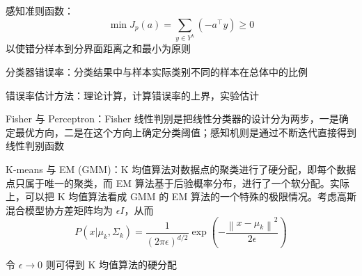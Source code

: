 \documentclass[openany]{ctexbook}
\theoremstyle{kaiti}
\theoremstyle{normal}
\begin{document}
感知准则函数：
  \begin{equation}
  \min J_p\left(a \right)=\sum_{y\in Y^k}\left(-a^{\top}y \right)\geqslant 0
  \end{equation}
  以使错分样本到分界面距离之和最小为原则

分类器错误率：分类结果中与样本实际类别不同的样本在总体中的比例

错误率估计方法：理论计算，计算错误率的上界，实验估计

Fisher 与 Perceptron：Fisher 线性判别是把线性分类器的设计分为两步，一是确定最优方向，二是在这个方向上确定分类阈值；感知机则是通过不断迭代直接得到线性判别函数

K-means 与 EM (GMM)：K 均值算法对数据点的聚类进行了硬分配，即每个数据点只属于唯一的聚类，而 EM 算法基于后验概率分布，进行了一个软分配。实际上，可以把 K 均值算法看成 GMM 的 EM 算法的一个特殊的极限情况。考虑高斯混合模型协方差矩阵均为 $\epsilon I$，从而
\begin{equation}
  P\left(x|\mu_k,\Sigma_k \right)=\frac{1}{\left(2\pi \epsilon \right)^{d/2}}\exp \left(-\frac{\left\| x-\mu_k \right\|^2}{2\epsilon}\right)
\end{equation}

令 $\epsilon \rightarrow 0$ 则可得到 K 均值算法的硬分配

\backmatter



\end{document}
